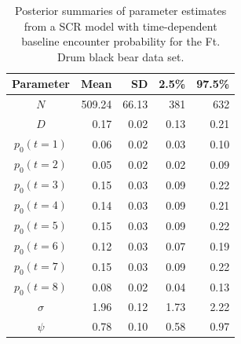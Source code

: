 \begin{table}[ht]
\centering
\caption{Posterior summaries of parameter estimates from a SCR model with time-dependent baseline 
encounter probability
 for the Ft. Drum black bear data set.}
\begin{tabular}{crrrr}
\hline \hline
Parameter & Mean & SD & 2.5\% & 97.5\% \\
\hline
$N$           &   509.24 &  66.13  & 381  & 632  \\
$D$           &    0.17     &  0.02    & 0.13 & 0.21 \\
$p_0 (t=1)$  &    0.06     & 0.02     & 0.03  & 0.10  \\
$p_0 (t=2)$  &    0.05  & 0.02  &      0.02 & 0.09  \\
$p_0 (t=3)$  &    0.15 &  0.03  &     0.09 & 0.22  \\
$p_0 (t=4)$  &    0.14 &  0.03  &     0.09 & 0.21  \\
$p_0 (t=5)$  &    0.15 &  0.03  &    0.09 &  0.22  \\
$p_0 (t=6)$  &    0.12 &  0.03  &    0.07 & 0.19  \\
$p_0 (t=7)$  &    0.15 &  0.03  &    0.09 & 0.22  \\
$p_0 (t=8)$  &    0.08 &  0.02  &    0.04 & 0.13  \\
$\sigma$ & 1.96 &  0.12  &   1.73 & 2.22  \\ 
$\psi$  &   0.78 &  0.10  &  0.58 & 0.97  \\ \hline
\end{tabular}
\label{covariates.tab.SCRt}
\end{table}

